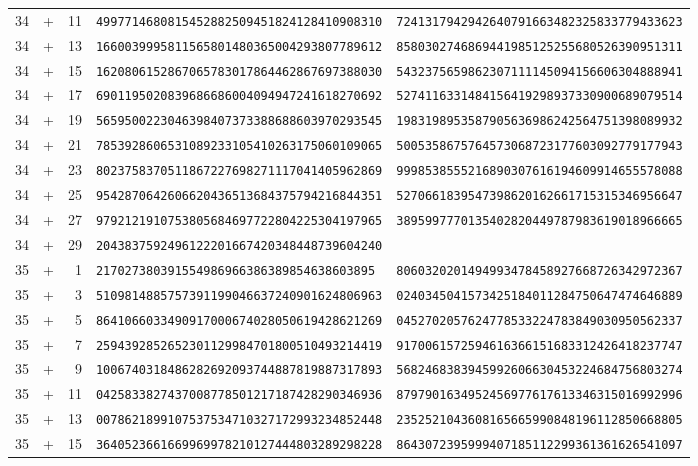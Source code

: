 \begin{longtable}{@{}rcrll@{}}
34&+&11&\texttt{4997714680815452882509451824128410908310}&\texttt{7241317942942640791663482325833779433623}\\
34&+&13&\texttt{1660039995811565801480365004293807789612}&\texttt{8580302746869441985125255680526390951311}\\
34&+&15&\texttt{1620806152867065783017864462867697388030}&\texttt{5432375659862307111145094156606304888941}\\
34&+&17&\texttt{6901195020839686686004094947241618270692}&\texttt{5274116331484156419298937330900689079514}\\
34&+&19&\texttt{5659500223046398407373388688603970293545}&\texttt{1983198953587905636986242564751398089932}\\
34&+&21&\texttt{7853928606531089233105410263175060109065}&\texttt{5005358675764573068723177603092779177943}\\
34&+&23&\texttt{8023758370511867227698271117041405962869}&\texttt{9998538555216890307616194609914655578088}\\
34&+&25&\texttt{9542870642606620436513684375794216844351}&\texttt{5270661839547398620162661715315346956647}\\
34&+&27&\texttt{9792121910753805684697722804225304197965}&\texttt{3895997770135402820449787983619018966665}\\
34&+&29&\texttt{2043837592496122201667420348448739604240}&\texttt{}\\
35&+&1&\texttt{217027380391554986966386389854638603895}&\texttt{8060320201494993478458927668726342972367}\\
35&+&3&\texttt{5109814885757391199046637240901624806963}&\texttt{0240345041573425184011284750647474646889}\\
35&+&5&\texttt{8641066033490917000674028050619428621269}&\texttt{0452702057624778533224783849030950562337}\\
35&+&7&\texttt{2594392852652301129984701800510493214419}&\texttt{9170061572594616366151683312426418237747}\\
35&+&9&\texttt{1006740318486282692093744887819887317893}&\texttt{5682468383945992606630453224684756803274}\\
35&+&11&\texttt{0425833827437008778501217187428290346936}&\texttt{8797901634952456977617613346315016992996}\\
35&+&13&\texttt{0078621899107537534710327172993234852448}&\texttt{2352521043608165665990848196112850668805}\\
35&+&15&\texttt{3640523661669969978210127444803289298228}&\texttt{8643072395999407185112299361361626541097}\\

\end{longtable}
